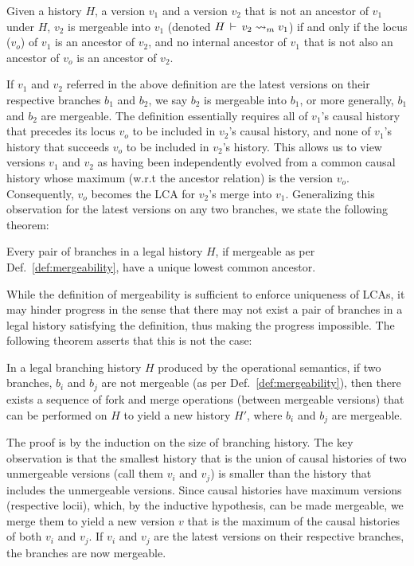 \begin{definition} 
\label{def:mergeability}
Given a history $H$, a version $v_1$ and a version $v_2$ that is not
an ancestor of $v_1$ under $H$, $v_2$ is mergeable into $v_1$ (denoted
$H\,\vdash\,v_2 \rightsquigarrow_m v_1$) if and only if the locus ($v_o$) of
$v_1$ is an ancestor of $v_2$, and no internal ancestor of $v_1$ that
is not also an ancestor of $v_o$ is an ancestor of $v_2$.
\end{definition}

If $v_1$ and $v_2$ referred in the above definition are the latest
versions on their respective branches $b_1$ and $b_2$, we say $b_2$ is
mergeable into $b_1$, or more generally, $b_1$ and $b_2$ are
mergeable. The definition essentially requires all of $v_1$'s causal
history that precedes its locus $v_o$ to be included in $v_2$'s causal
history, and none of $v_1$'s history that succeeds $v_o$ to be
included in $v_2$'s history. This allows us to view versions $v_1$ and
$v_2$ as having been independently evolved from a common causal
history whose maximum (w.r.t the ancestor relation) is the version
$v_o$. Consequently, $v_o$ becomes the LCA for $v_2$'s merge into
$v_1$. Generalizing this observation for the latest versions on
any two branches, we state the following theorem:

\begin{theorem} 
Every pair of branches in a legal history $H$, if mergeable as per
Def.~\ref{def:mergeability}, have a unique lowest common ancestor.
\end{theorem}

While the definition of mergeability is sufficient to enforce
uniqueness of LCAs, it may hinder progress in the sense that there may
not exist a pair of branches in a legal history satisfying the
definition, thus making the progress impossible. The following theorem
asserts that this is not the case:

\begin{theorem} 
In a legal branching history $H$ produced by the operational
semantics, if two branches, $b_i$ and $b_j$ are not mergeable (as per
Def.~\ref{def:mergeability}), then there exists a sequence of fork and
merge operations (between mergeable versions) that can be performed on
$H$ to yield a new history $H'$, where $b_i$ and $b_j$ are mergeable.
\end{theorem}

The proof is by the induction on the size of branching history. The
key observation is that the smallest history that is the union of
causal histories of two unmergeable versions (call them $v_i$ and
$v_j$) is smaller than the history that includes the unmergeable
versions. Since causal histories have maximum versions (respective
locii), which, by the inductive hypothesis, can be made mergeable, we
merge them to yield a new version $v$ that is the maximum of the
causal histories of both $v_i$ and $v_j$. If $v_i$ and $v_j$ are the
latest versions on their respective branches, the branches are now
mergeable.

